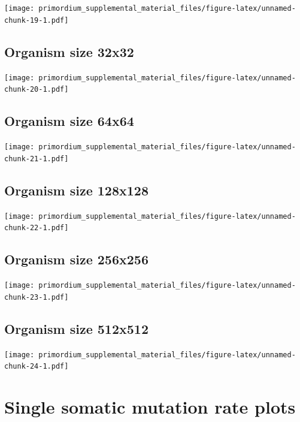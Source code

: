 \documentclass[]{book}
\begin{document}
\texttt{[image: primordium\_supplemental\_material\_files/figure-latex/unnamed-chunk-19-1.pdf]}

\hypertarget{organism-size-32x32}{%
\subsection{Organism size 32x32}\label{organism-size-32x32}}

\texttt{[image: primordium\_supplemental\_material\_files/figure-latex/unnamed-chunk-20-1.pdf]}

\hypertarget{organism-size-64x64}{%
\subsection{Organism size 64x64}\label{organism-size-64x64}}

\texttt{[image: primordium\_supplemental\_material\_files/figure-latex/unnamed-chunk-21-1.pdf]}

\hypertarget{organism-size-128x128}{%
\subsection{Organism size 128x128}\label{organism-size-128x128}}

\texttt{[image: primordium\_supplemental\_material\_files/figure-latex/unnamed-chunk-22-1.pdf]}

\hypertarget{organism-size-256x256}{%
\subsection{Organism size 256x256}\label{organism-size-256x256}}

\texttt{[image: primordium\_supplemental\_material\_files/figure-latex/unnamed-chunk-23-1.pdf]}

\hypertarget{organism-size-512x512}{%
\subsection{Organism size 512x512}\label{organism-size-512x512}}

\texttt{[image: primordium\_supplemental\_material\_files/figure-latex/unnamed-chunk-24-1.pdf]}

\hypertarget{single-somatic-mutation-rate-plots}{%
\section{Single somatic mutation rate plots}\label{single-somatic-mutation-rate-plots}}
\end{document}
